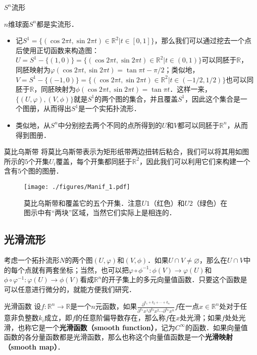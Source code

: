 \begin{example}{$S^n$流形}

$n$维球面$S^n$都是实流形．
\begin{itemize}
\item 记$S^1=\{(\cos{2\pi t},\sin{2\pi t})\in\mathbb{R}^2|t\in[0, 1]\}$，那么我们可以通过挖去一个点后使用正切函数来构造图：$U=S^1-\{(1,0)\}=\{(\cos{2\pi t},\sin{2\pi t})\in\mathbb{R}^2|t\in(0, 1)\}$可以同胚于$\mathbb{R}$，同胚映射为$\varphi(\cos{2\pi t},\sin{2\pi t})=\tan{\pi t-\pi/2}$；类似地，$V=S^1-\{(-1, 0)\}=\{(\cos{2\pi t},\sin{2\pi t})\in\mathbb{R}^2|t\in(-1/2, 1/2)\}$也可以同胚于$\mathbb{R}$，同胚映射为$\phi(\cos{2\pi t},\sin{2\pi t})= \tan{\pi t}$．这样一来，$\{(U, \varphi), (V, \phi)\}$就是$S^1$的两个图的集合，并且覆盖$S^1$，因此这个集合是一个图册，从而得出$S^1$是一个实拓扑流形．
\item 类似地，从$S^n$中分别挖去两个不同的点所得到的$U$和$V$都可以同胚于$\mathbb{R}^n$，从而得到图册．


\end{itemize}

\end{example}

\begin{example}{莫比乌斯带}
将莫比乌斯带表示为矩形纸带两边扭转后粘合，我们可以将其用如图所示的$5$个开集$U_i$覆盖，每个开集都同胚于$\mathbb{R}^2$，因此我们可以利用它们来构建一个含有$5$个图的图册．
\begin{figure}[ht]
\centering
\texttt{[image: ./figures/Manif\_1.pdf]}
\caption{莫比乌斯带和覆盖它的五个开集．注意$U1$（红色）和$U2$（绿色）在图示中有“两块”区域，当然它们实际上是相连的．} \label{Manif_fig1}
\end{figure}
\end{example}

\subsection{光滑流形}

考虑一个拓扑流形$N$的两个图$(U, \varphi)$和$(V, \phi)$．如果$U\cap V\not=\varnothing$，那么在$U\cap V$中的每个点就有两套坐标；当然，也可以把$\varphi\circ\phi^{-1}:\phi(V)\rightarrow\varphi(U)$和$\phi\circ\varphi^{-1}:\varphi(U)\rightarrow\phi(V)$看成$\mathbb{R}^n$的开子集上的多元向量值函数．只要这个函数是可以任意进行微分的，就能方便我们研究．

\begin{definition}{光滑函数}
设$f:\mathbb{R}^n\rightarrow\mathbb{R}$是一个$n$元函数，如果$\frac{\partial^{k_1+k_2+\cdots+k_n}}{\partial^{k_1}x^1\partial^{k_2}x^2\cdots\partial^{k_n}x^n} f$在一点$x\in\mathbb{R}^n$处对于任意非负整数$k_i$成立，即$f$的任意阶偏导数存在，那么称$f$在$x$处光滑；如果$f$处处光滑，也称它是一个\textbf{光滑函数（smooth function）}，记为$C^\infty$的函数．如果向量值函数的各分量函数都是光滑函数，那么也称这个向量值函数是一个\textbf{光滑映射（smooth map）}．
\end{definition}

